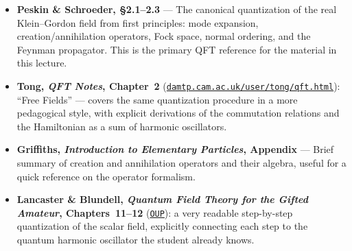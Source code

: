 \begin{itemize}
  \item \textbf{Peskin \& Schroeder, \S2.1--2.3} — The canonical quantization
    of the real Klein--Gordon field from first principles: mode expansion,
    creation/annihilation operators, Fock space, normal ordering, and the Feynman
    propagator.  This is the primary QFT reference for the material in this
    lecture.

  \item \textbf{Tong, \textit{QFT Notes}, Chapter~2}
    (\href{https://www.damtp.cam.ac.uk/user/tong/qft.html}{\texttt{damtp.cam.ac.uk/user/tong/qft.html}}):
    ``Free Fields'' — covers the same quantization procedure in a more pedagogical
    style, with explicit derivations of the commutation relations and the Hamiltonian
    as a sum of harmonic oscillators.

  \item \textbf{Griffiths, \textit{Introduction to Elementary Particles}, Appendix}
    — Brief summary of creation and annihilation operators and their algebra, useful
    for a quick reference on the operator formalism.

  \item \textbf{Lancaster \& Blundell, \textit{Quantum Field Theory for the Gifted
    Amateur}, Chapters~11--12}
    (\href{https://global.oup.com/academic/product/quantum-field-theory-for-the-gifted-amateur-9780199699322}{\texttt{OUP}}):
    a very readable step-by-step quantization of the scalar field,
    explicitly connecting each step to the quantum harmonic oscillator the student
    already knows.
\end{itemize}
